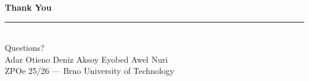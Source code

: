 \documentclass[aspectratio=169]{beamer}
\begin{document}
\begin{frame}[plain]
  \vfill
  \centering
  {\color{accent}\Huge\textbf{Thank You}}\\[0.5cm]
  \textcolor{muted}{\rule{0.4\textwidth}{0.4pt}}\\[0.5cm]
  {\color{textlight}\large Questions?}\\[0.8cm]
  {\color{muted}
    Adar Otieno \quad Deniz Aksoy \quad Eyobed Awel Nuri\\[0.2cm]
    \small ZPOe 25/26 — Brno University of Technology
  }
  \vfill
\end{frame}
\end{document}

